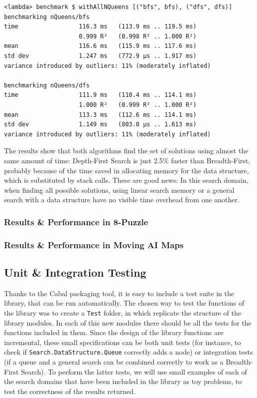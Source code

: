 \begin{lstlisting}
<lambda> benchmark $ withAllNQueens [("bfs", bfs), ("dfs", dfs)]
benchmarking nQueens/bfs
time                 116.3 ms   (113.9 ms .. 119.5 ms)
                     0.999 R²   (0.998 R² .. 1.000 R²)
mean                 116.6 ms   (115.9 ms .. 117.6 ms)
std dev              1.247 ms   (772.9 µs .. 1.917 ms)
variance introduced by outliers: 11% (moderately inflated)

benchmarking nQueens/dfs
time                 111.9 ms   (110.4 ms .. 114.1 ms)
                     1.000 R²   (0.999 R² .. 1.000 R²)
mean                 113.3 ms   (112.6 ms .. 114.1 ms)
std dev              1.149 ms   (803.0 µs .. 1.613 ms)
variance introduced by outliers: 11% (moderately inflated)
\end{lstlisting}

The results show that both algorithms find the set of solutions using almost
the same amount of time: Depth-First Search is just 2.5\% faster than
Breadth-First, probably because of the time saved in allocating memory for the
data structure, which is substituted by stack calls. These are good news: In
this search domain, when finding all possible solutions, using linear search
memory or a general search with a data structure have no visible time overhead
from one another.\\

\subsubsection{Results \& Performance in 8-Puzzle}

\subsubsection{Results \& Performance in Moving AI Maps}


\subsection{Unit \& Integration Testing}

Thanks to the Cabal packaging tool, it is easy to include a test suite in the
library, that can be run automatically. The chosen way to test the functions of
the library was to create a \texttt{Test} folder, in which replicate the
structure of the library modules. In each of this new modules there should be
all the tests for the functions included in them. Since the design of the
library functions are incremental, these small specifications can be both unit
tests (for instance, to check if \texttt{Search.DataStructure.Queue} correctly
adds a node) or integration tests (if a queue and a general search can be
combined correctly to work as a Breadth-First Search). To perform the latter
tests, we will use small examples of each of the search domains that have been
included in the library as toy problems, to test the correctness of the results
returned.\\

